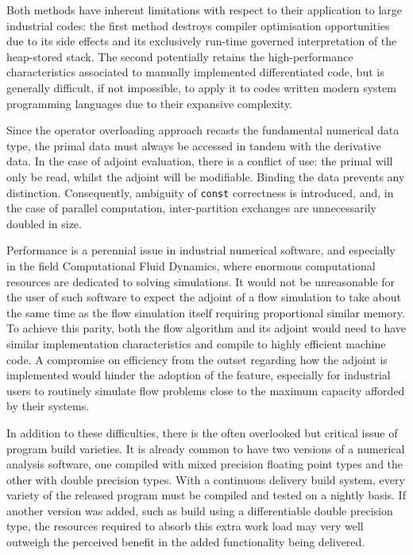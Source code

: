 \documentclass[a4paper,10pt]{article}
\begin{document}
Both methods have inherent limitations with respect to their application to large industrial codes: the first method destroys compiler optimisation opportunities due to its side effects and its exclusively run-time governed interpretation of the heap-stored stack. The second potentially retains the high-performance characteristics associated to manually implemented differentiated code, but is generally difficult, if not impossible, to apply it to codes written modern system programming languages due to their expansive complexity.

Since the operator overloading approach recasts the fundamental numerical data type, the primal data must always be accessed in tandem with the derivative data. In the case of adjoint evaluation, there is a conflict of use: the primal will only be read, whilst the adjoint will be modifiable. Binding the data prevents any distinction. Consequently, ambiguity of \texttt{const} correctness is introduced, and, in the case of parallel computation, inter-partition exchanges are unnecessarily doubled in size.

Performance is a perennial issue in industrial numerical software, and especially in the field Computational Fluid Dynamics, where enormous computational resources are dedicated to solving simulations. It would not be unreasonable for the user of such software to expect the adjoint of a flow simulation to take about the same time as the flow simulation itself requiring proportional similar memory. To achieve this parity, both the flow algorithm and its adjoint would need to have similar implementation characteristics and compile to highly efficient machine code. A compromise on efficiency from the outset regarding how the adjoint is implemented would hinder the adoption of the feature, especially for industrial users to routinely simulate flow problems close to the maximum capacity afforded by their systems.

In addition to these difficulties, there is the often overlooked but critical issue of program build varieties. It is already common to have two versions of a numerical analysis software, one compiled with mixed precision floating point types and the other with double precision types. With a continuous delivery build system, every variety of the released program must be compiled and tested on a nightly basis. If another version was added, such as build using a differentiable double precision type, the resources required to absorb this extra work load may very well outweigh the perceived benefit in the added functionality being delivered.
\end{document}
